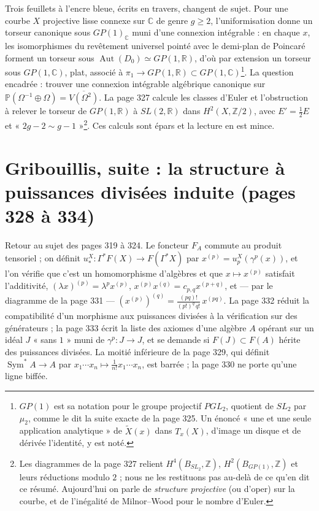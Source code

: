 \documentclass[11pt,a4paper]{article}
\begin{document}
Trois feuillets à l'encre bleue, écrits en travers, changent de sujet. Pour une
courbe $X$ projective lisse connexe sur $\mathbb{C}$ de genre $g \geq 2$,
l'uniformisation donne un torseur canonique sous $GP(1)_{\mathbb{C}}$ muni d'une
connexion intégrable : en chaque $x$, les isomorphismes du revêtement universel
pointé avec le demi-plan de Poincaré forment un torseur sous $\operatorname{Aut}
(D_0) \simeq GP(1, \mathbb{R})$, d'où par extension un torseur sous
$GP(1,\mathbb{C})$, plat, associé à $\pi_1 \to GP(1, \mathbb{R}) \subset
GP(1,\mathbb{C})$\footnote{$GP(1)$ est sa notation pour le groupe projectif
$PGL_2$, quotient de $SL_2$ par $\mu_2$, comme le dit la suite exacte de la page
325. Un énoncé « une et une seule application analytique » de $\tilde{X}(x)$
dans $T_x(X)$, d'image un disque et de dérivée l'identité, y est noté.}. La
question encadrée : trouver une connexion intégrable algébrique canonique sur
$\mathbb{P}(\Omega^{-1} \oplus \Omega) = \overline{V(\Omega^2)}$. La page 327
calcule les classes d'Euler et l'obstruction à relever le torseur de
$GP(1,\mathbb{R})$ à $SL(2,\mathbb{R})$ dans $H^2(X, \mathbb{Z}/2)$, avec $E' =
\frac12 E$ et « $2g - 2 \sim g - 1$ »\footnote{Les diagrammes de la page 327
relient $H^4(B_{SL_2}, \mathbb{Z})$, $H^2(B_{GP(1)}, \mathbb{Z})$ et leurs
réductions modulo $2$ ; nous ne les restituons pas au-delà de ce qu'en dit ce
résumé. Aujourd'hui on parle de \emph{structure projective} (ou d'oper) sur la
courbe, et de l'inégalité de Milnor–Wood pour le nombre d'Euler.}. Ces calculs
sont épars et la lecture en est mince.

\section*{Gribouillis, suite : la structure à puissances divisées induite (pages 328 à 334)}

Retour au sujet des pages 319 à 324. Le foncteur $F_A$ commute au produit
tensoriel ; on définit $u^X_* : \Gamma^*F(X) \to F(\Gamma^*X)$ par $x^{(p)} =
u^X_p(\gamma^p(x))$, et l'on vérifie que c'est un homomorphisme d'algèbres et que
$x \mapsto x^{(p)}$ satisfait l'additivité, $(\lambda x)^{(p)} =
\lambda^px^{(p)}$, $x^{(p)}x^{(q)} = c_{p,q}x^{(p+q)}$, et — par le diagramme de
la page 331 — $(x^{(p)})^{(q)} = \frac{(pq)!}{(p!)^q\,q!}\,x^{(pq)}$. La page 332
réduit la compatibilité d'un morphisme aux puissances divisées à la vérification
sur des générateurs ; la page 333 écrit la liste des axiomes d'une algèbre $A$
opérant sur un idéal $J$ « sans $1$ » muni de $\gamma^p : J \to J$, et se demande
si $F(J) \subset F(A)$ hérite des puissances divisées. La moitié inférieure de
la page 329, qui définit $\operatorname{Sym}^*A \to A$ par $x_1\cdots x_n \mapsto
\frac{1}{n!}x_1\cdots x_n$, est barrée ; la page 330 ne porte qu'une ligne
biffée.
\end{document}
